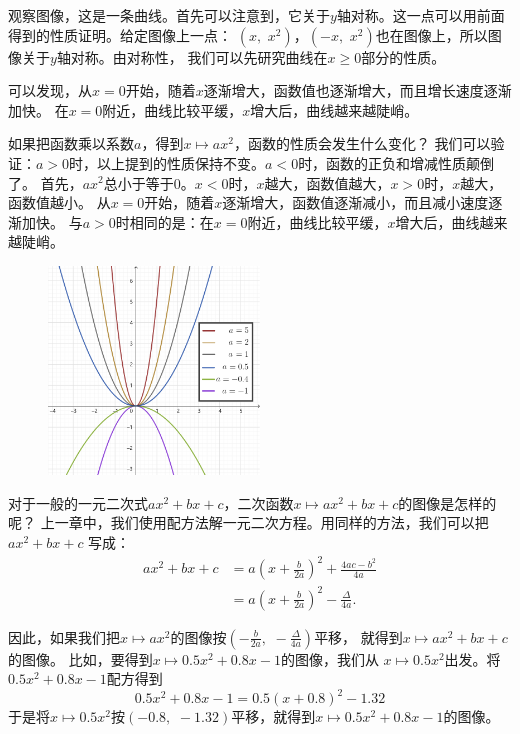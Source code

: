 \documentclass[12pt,UTF8]{ctexbook}
\begin{document}
观察图像，这是一条曲线。首先可以注意到，它关于$y$轴对称。这一点可以用前面得到的性质证明。给定图像上一点：
$(x, \,\,x^2)$，$(-x, \,\,x^2)$也在图像上，所以图像关于$y$轴对称。由对称性，
我们可以先研究曲线在$x\geqslant 0$部分的性质。

可以发现，从$x=0$开始，随着$x$逐渐增大，函数值也逐渐增大，而且增长速度逐渐加快。
在$x=0$附近，曲线比较平缓，$x$增大后，曲线越来越陡峭。

如果把函数乘以系数$a$，得到$x\mapsto ax^2$，函数的性质会发生什么变化？
我们可以验证：$a > 0$时，以上提到的性质保持不变。$a < 0$时，函数的正负和增减性质颠倒了。
首先，$ax^2$总小于等于$0$。$x<0$时，$x$越大，函数值越大，$x>0$时，$x$越大，函数值越小。
从$x=0$开始，随着$x$逐渐增大，函数值逐渐减小，而且减小速度逐渐加快。
与$a>0$时相同的是：在$x=0$附近，曲线比较平缓，$x$增大后，曲线越来越陡峭。

\begin{figure}[h] %
    \vspace{8pt}
    \centering
    \includegraphics[width=0.5\textwidth]{tu/二次函数2.png}
\end{figure}

对于一般的一元二次式$ax^2+bx+c$，二次函数$x\mapsto ax^2+bx+c$的图像是怎样的呢？
上一章中，我们使用配方法解一元二次方程。用同样的方法，我们可以把$ax^2+bx+c$
写成：
\begin{align*}
    ax^2+bx+c &= a\left(x + \frac{b}{2a}\right)^2 + \frac{4ac - b^2}{4a}  \\
    &= a\left(x + \frac{b}{2a}\right)^2 - \frac{\Delta}{4a}. 
\end{align*}

因此，如果我们把$x\mapsto ax^2$的图像按$\left(-\frac{b}{2a}, \,\,-\frac{\Delta}{4a}\right)$平移，
就得到$x\mapsto ax^2+bx+c$的图像。
比如，要得到$x\mapsto 0.5x^2+0.8x-1$的图像，我们从
$x\mapsto 0.5x^2$出发。将$0.5x^2+0.8x-1$配方得到
$$ 0.5x^2+0.8x-1 = 0.5\left(x + 0.8\right)^2 - 1.32$$
于是将$x\mapsto 0.5x^2$按$(-0.8, \,\,-1.32)$平移，就得到$x\mapsto 0.5x^2+0.8x-1$的图像。
\end{document}
